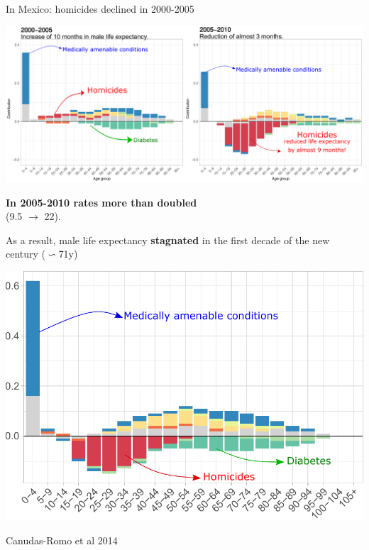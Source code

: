 \documentclass[xcolor={dvipsnames}]{beamer}
\begin{document}
\begin{frame}
	\begin{center}
		\Large{In Mexico: homicides declined in 2000-2005}
	\end{center}

	
	\hspace*{-1cm}   
	\includegraphics[scale=.31]{Figures/Fig2_2}
	
	\begin{center}
		\Large{\textbf{In 2005-2010 rates more than doubled}\\
		 (9.5 $\longrightarrow$ 22).}
	\end{center}	

\end{frame}



\begin{frame}
	\begin{center}
		\Large{	As a result, male life expectancy \textbf{stagnated} in the first decade of the new century ($\backsim 	$71y)}
	\end{center}
		
	\begin{center}
		\includegraphics[scale=.65]{Figures/Fig_1}
	\end{center}

	\tiny{Canudas-Romo et al 2014}
	
\end{frame}
\end{document}
